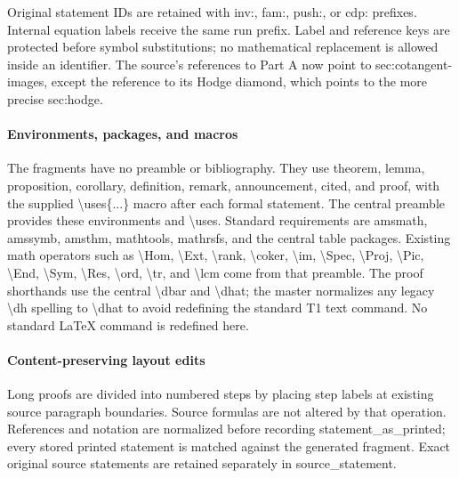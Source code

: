 Original statement IDs are retained with inv:\allowbreak{}, fam:\allowbreak{}, push:\allowbreak{}, or cdp:\allowbreak{} prefixes. Internal equation labels receive the same run prefix. Label and reference keys are protected before symbol substitutions; no mathematical replacement is allowed inside an identifier. The source's references to Part A now point to sec:\allowbreak{}cotangent-images, except the reference to its Hodge diamond, which points to the more precise sec:\allowbreak{}hodge.
\paragraph{Environments, packages, and macros}
The fragments have no preamble or bibliography. They use theorem, lemma, proposition, corollary, definition, remark, announcement, cited, and proof, with the supplied \textbackslash{}uses\{...\} macro after each formal statement. The central preamble provides these environments and \textbackslash{}uses. Standard requirements are amsmath, amssymb, amsthm, mathtools, mathrsfs, and the central table packages. Existing math operators such as \textbackslash{}Hom, \textbackslash{}Ext, \textbackslash{}rank, \textbackslash{}coker, \textbackslash{}im, \textbackslash{}Spec, \textbackslash{}Proj, \textbackslash{}Pic, \textbackslash{}End, \textbackslash{}Sym, \textbackslash{}Res, \textbackslash{}ord, \textbackslash{}tr, and \textbackslash{}lcm come from that preamble. The proof shorthands use the central \textbackslash{}dbar and \textbackslash{}dhat; the master normalizes any legacy \textbackslash{}dh spelling to \textbackslash{}dhat to avoid redefining the standard T1 text command. No standard LaTeX command is redefined here.
\paragraph{Content-preserving layout edits}
Long proofs are divided into numbered steps by placing step labels at existing source paragraph boundaries. Source formulas are not altered by that operation. References and notation are normalized before recording statement\_\allowbreak{}as\_\allowbreak{}printed; every stored printed statement is matched against the generated fragment. Exact original source statements are retained separately in source\_\allowbreak{}statement.
